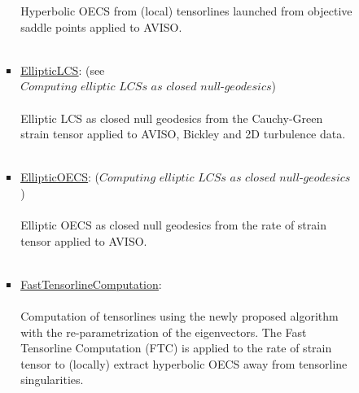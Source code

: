 \documentclass{article}
\begin{document}
\begin{enumerate}
\begin{enumerate}
\begin{enumerate}
\begin{itemize}
Hyperbolic OECS from (local) tensorlines launched from objective saddle points applied to AVISO. \\ \\
\item \href{https://github.com/EncinasBartos/TBarrier/tree/main/TBarrier/2D/demos/AdvectiveBarriers/EllipticLCS}{\underline{EllipticLCS}}: (see $ \textit{Computing elliptic LCSs as closed null-geodesics} $)\\ \\
Elliptic LCS as closed null geodesics from the Cauchy-Green strain tensor applied to AVISO, Bickley and 2D turbulence data. \\ \\
\item \href{https://github.com/EncinasBartos/TBarrier/tree/main/TBarrier/2D/demos/AdvectiveBarriers/EllipticOECS}{\underline{EllipticOECS}}: ($ \textit{Computing elliptic LCSs as closed null-geodesics} $) \\ \\
Elliptic OECS as closed null geodesics from the rate of strain tensor applied to AVISO.
\\ \\
\item \href{https://github.com/EncinasBartos/TBarrier/tree/main/TBarrier/2D/demos/AdvectiveBarriers/FastTensorlineComputation}{\underline{FastTensorlineComputation}}: \\ \\

Computation of tensorlines using the newly proposed algorithm with the re-parametrization of the eigenvectors. The Fast Tensorline Computation (FTC) is applied to the rate of strain tensor to (locally) extract hyperbolic OECS away from tensorline singularities.\\ \\


\end{itemize}
\end{enumerate}
\end{enumerate}
\end{enumerate}
\end{document}
